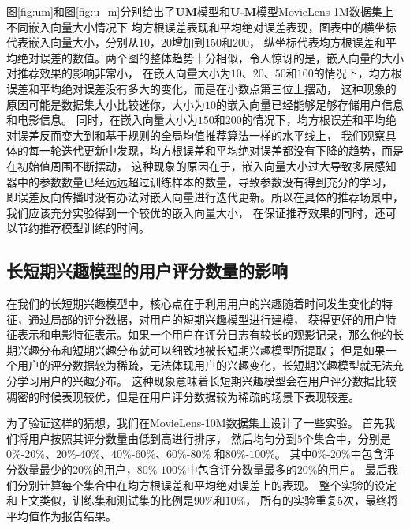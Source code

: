 图\ref{fig:um}和图\ref{fig:u_m}分别给出了\textbf{UM}模型和\textbf{U-M}模型MovieLens-1M数据集上不同嵌入向量大小情况下
均方根误差表现和平均绝对误差表现，图表中的横坐标代表嵌入向量大小，分别从$10$，$20$增加到$150$和$200$，
纵坐标代表均方根误差和平均绝对误差的数值。两个图的整体趋势十分相似，令人惊讶的是，嵌入向量的大小对推荐效果的影响非常小，
在嵌入向量大小为$10$、$20$、$50$和$100$的情况下，均方根误差和平均绝对误差没有多大的变化，而是在小数点第三位上摆动，
这种现象的原因可能是数据集大小比较迷你，大小为$10$的嵌入向量已经能够足够存储用户信息和电影信息。
同时，在嵌入向量大小为$150$和$200$的情况下，均方根误差和平均绝对误差反而变大到和基于规则的全局均值推荐算法一样的水平线上，
我们观察具体的每一轮迭代更新中发现，均方根误差和平均绝对误差都没有下降的趋势，而是在初始值周围不断摆动，
这种现象的原因在于，嵌入向量大小过大导致多层感知器中的参数数量已经远远超过训练样本的数量，导致参数没有得到充分的学习，
即误差反向传播时没有办法对嵌入向量进行迭代更新。所以在具体的推荐场景中，我们应该充分实验得到一个较优的嵌入向量大小，
在保证推荐效果的同时，还可以节约推荐模型训练的时间。

\subsection{长短期兴趣模型的用户评分数量的影响}
在我们的长短期兴趣模型中，核心点在于利用用户的兴趣随着时间发生变化的特征，通过局部的评分数据，对用户的短期兴趣模型进行建模，
获得更好的用户特征表示和电影特征表示。如果一个用户在评分日志有较长的观影记录，那么他的长期兴趣分布和短期兴趣分布就可以细致地被长短期兴趣模型所提取；
但是如果一个用户的评分数据较为稀疏，无法体现用户的兴趣变化，长短期兴趣模型就无法充分学习用户的兴趣分布。
这种现象意味着长短期兴趣模型会在用户评分数据比较稠密的时候表现较优，但是在用户评分数据较为稀疏的场景下表现较差。

为了验证这样的猜想，我们在MovieLens-10M数据集上设计了一些实验。
首先我们将用户按照其评分数量由低到高进行排序，
然后均匀分到$5$个集合中，分别是$0\%$-$20\%$、$20\%$-$40\%$、$40\%$-$60\%$、$60\%$-$80\%$
和$80\%$-$100\%$。
其中$0\%$-$20\%$中包含评分数量最少的$20\%$的用户，$80\%$-$100\%$中包含评分数量最多的$20\%$的用户。
最后我们分别计算每个集合中在均方根误差和平均绝对误差上的表现。
整个实验的设定和上文类似，训练集和测试集的比例是$90\%$和$10\%$，
所有的实验重复$5$次，最终将平均值作为报告结果。

